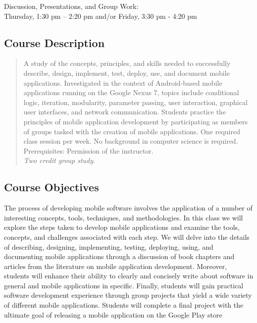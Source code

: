 Discussion, Presentations, and Group Work: \\ Thursday, 1:30 pm -- 2:20 pm and/or Friday, 3:30 pm - 4:20 pm 

\subsection*{Course Description}

\begin{quote}

	A study of the concepts, principles, and skills needed to successfully describe, design, implement, test, deploy,
	use, and document mobile applications.  Investigated in the context of Android-based mobile applications running on
	the Google Nexus 7, topics include conditional logic, iteration, modularity, parameter passing, user interaction,
	graphical user interfaces, and network communication. Students practice the principles of mobile application
	development by participating as members of groups tasked with the creation of mobile applications.  One required
	class session per week. No background in computer science is required. Prerequisites: Permission of the instructor.
	\\ {\em Two credit group study}.
	
\end{quote}

\subsection*{Course Objectives}

The process of developing mobile software involves the application of a number of interesting concepts, tools,
techniques, and methodologies.  In this class we will explore the steps taken to develop mobile applications and examine
the tools, concepts, and challenges associated with each step.  We will delve into the details of describing, designing,
implementing, testing, deploying, using, and documenting mobile applications through a discussion of book chapters and
articles from the literature on mobile application development.  Moreover, students will enhance their ability to
clearly and concisely write about software in general and mobile applications in specific.  Finally, students will gain
practical software development experience through group projects that yield a wide variety of different mobile
applications. Students will complete a final project with the ultimate goal of releasing a mobile application on the
Google Play store

